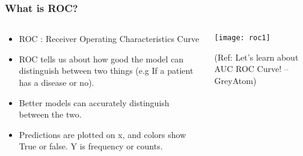 \begin{frame}[fragile]\frametitle{What is ROC?}

\begin{columns}
\begin{column}[T]{0.5\linewidth}
\begin{itemize}
\item ROC : Receiver Operating Characteristics Curve
\item ROC tells us about how good
the model can distinguish between two things (e.g If a patient has a
disease or no). 
\item Better models can accurately distinguish between the two.
\item Predictions are plotted on x, and colors show True or false. Y is frequency or counts.
\end{itemize}
\end{column}
\begin{column}[T]{0.5\linewidth}

\begin{center}
\texttt{[image: roc1]}
\end{center}

\tiny{(Ref: Let's learn about AUC ROC Curve! – GreyAtom)}
\end{column}

\end{columns}
\end{frame}

